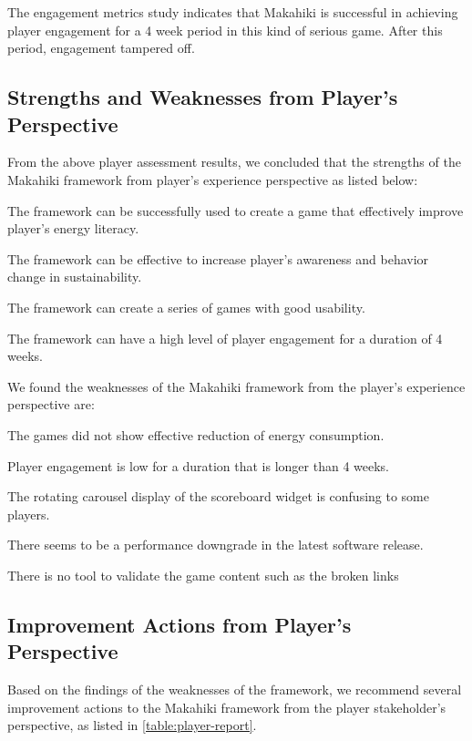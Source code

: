 The engagement metrics study indicates that Makahiki is successful in achieving player engagement for a 4 week period in this kind of serious game. After this period, engagement tampered off. 

\subsection{Strengths and Weaknesses from Player's Perspective}

From the above player assessment results, we concluded that the strengths of the Makahiki framework from player's experience perspective as listed below:   

\begin{compactenum}
    \item The framework can be successfully used to create a game that effectively improve player's energy literacy.
    \item The framework can be effective to increase player's awareness and behavior change in sustainability.
    \item The framework can create a series of games with good usability.
    \item The framework can have a high level of player engagement for a duration of 4 weeks.
\end{compactenum}               

We found the weaknesses of the Makahiki framework from the player's experience perspective are:
\begin{compactenum}
     \item The games did not show effective reduction of energy consumption.
     \item Player engagement is low for a duration that is longer than 4 weeks. 
     \item The rotating carousel display of the scoreboard widget is confusing to some players.
     \item There seems to be a performance downgrade in the latest software release.
     \item There is no tool to validate the game content such as the broken links
\end{compactenum}  

\subsection{Improvement Actions from Player's Perspective}

Based on the findings of the weaknesses of the framework, we recommend several improvement actions to the Makahiki framework from the player stakeholder's perspective, as listed in \autoref{table:player-report}.

